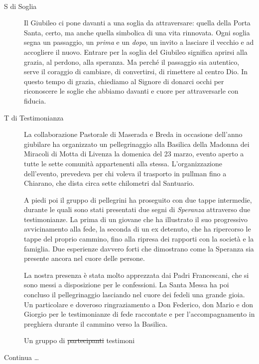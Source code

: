 \newpage
{}
\paragraph{}
\vspace*{-\parskip}
\begin{description}
  \item[S di Soglia] Il Giubileo ci pone davanti a una soglia da attraversare: quella della Porta Santa, certo, ma anche quella simbolica di una vita rinnovata. Ogni soglia segna un passaggio, un \textit{prima} e un \textit{dopo}, un invito a lasciare il vecchio e ad accogliere il nuovo. Entrare per la soglia del Giubileo significa aprirsi alla grazia, al perdono, alla speranza. Ma perché il passaggio sia autentico, serve il coraggio di cambiare, di convertirsi, di rimettere al centro Dio. In questo tempo di grazia, chiediamo al Signore di donarci occhi per riconoscere le soglie che abbiamo davanti e cuore per attraversarle con fiducia.
\end{description}

\begin{description}
  \item[T di Testimonianza] La collaborazione Pastorale di Maserada e Breda in occasione dell'anno giubilare ha organizzato un pellegrinaggio alla Basilica della Madonna dei Miracoli di Motta di Livenza la domenica del 23 marzo, evento aperto a tutte le sette comunità appartenenti alla stessa. L'organizzazione dell'evento, prevedeva per chi voleva il trasporto in pullman fino a Chiarano, che dista circa sette chilometri dal Santuario.

  A piedi poi il gruppo di pellegrini ha proseguito con due tappe intermedie, durante le quali sono stati presentati due segni di \textit{Speranza} attraverso due testimonianze. La prima di un giovane che ha illustrato il suo progressivo avvicinamento alla fede, la seconda di un ex detenuto, che ha ripercorso le tappe del proprio cammino, fino alla ripresa dei rapporti con la società e la famiglia. Due esperienze davvero forti che dimostrano come la Speranza sia presente ancora nel cuore delle persone.

  La nostra presenza è stata molto apprezzata dai Padri Francescani, che si sono messi a disposizione per le confessioni. La Santa Messa ha poi concluso il pellegrinaggio lasciando nel cuore dei fedeli una grande gioia. Un particolare e doveroso ringraziamento a Don Federico, don Mario e don Giorgio per le testimonianze di fede raccontate e per l'accompagnamento in preghiera durante il cammino verso la Basilica.

  Un gruppo di \sout{partecipanti} testimoni
\end{description}

Continua \ldots

